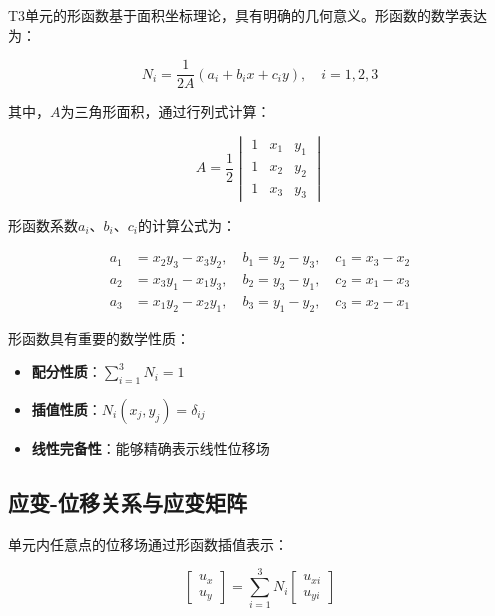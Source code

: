 \documentclass[12pt,a4paper]{article}
\begin{document}
T3单元的形函数基于面积坐标理论，具有明确的几何意义。形函数的数学表达为：

\begin{equation}
N_i = \frac{1}{2A}(a_i + b_i x + c_i y), \quad i=1,2,3
\end{equation}

其中，$A$为三角形面积，通过行列式计算：

\begin{equation}
A = \frac{1}{2}\begin{vmatrix}
1 & x_1 & y_1 \\
1 & x_2 & y_2 \\
1 & x_3 & y_3
\end{vmatrix}
\end{equation}

形函数系数$a_i$、$b_i$、$c_i$的计算公式为：

\begin{align}
a_1 &= x_2y_3 - x_3y_2, \quad b_1 = y_2 - y_3, \quad c_1 = x_3 - x_2 \\
a_2 &= x_3y_1 - x_1y_3, \quad b_2 = y_3 - y_1, \quad c_2 = x_1 - x_3 \\
a_3 &= x_1y_2 - x_2y_1, \quad b_3 = y_1 - y_2, \quad c_3 = x_2 - x_1
\end{align}

形函数具有重要的数学性质：
\begin{itemize}
    \item \textbf{配分性质}：$\sum_{i=1}^3 N_i = 1$
    \item \textbf{插值性质}：$N_i(x_j, y_j) = \delta_{ij}$
    \item \textbf{线性完备性}：能够精确表示线性位移场
\end{itemize}

\subsection{应变-位移关系与应变矩阵}

单元内任意点的位移场通过形函数插值表示：

\begin{equation}
\begin{bmatrix} u_x \\ u_y \end{bmatrix} = \sum_{i=1}^{3} N_i \begin{bmatrix} u_{xi} \\ u_{yi} \end{bmatrix}
\end{equation}
\end{document}
